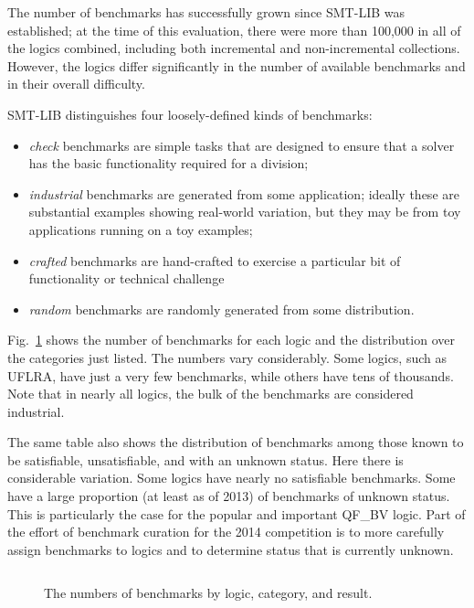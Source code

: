 \documentclass[smallcondensed]{svjour3}
\begin{document}
The number of benchmarks has successfully grown since SMT-LIB was established; at the time of this evaluation, there were more than 100,000 in all of the logics combined, including both incremental and non-incremental collections. However, the logics differ significantly in the number of available benchmarks and in their overall difficulty.

SMT-LIB distinguishes four loosely-defined kinds of benchmarks:
\begin{itemize}[noitemsep,nolistsep]
\item {\em check} benchmarks are simple tasks that are designed to ensure that a solver has the basic functionality required for a division;
\item {\em industrial} benchmarks are generated from some application; ideally these are substantial examples showing real-world variation, but they may be from toy applications running on a toy examples;
\item {\em crafted} benchmarks are hand-crafted to exercise a particular bit of functionality or technical challenge
\item {\em random} benchmarks are randomly generated from some distribution.
\end{itemize}
Fig.~\ref{Fig:category} shows the number of benchmarks for each logic and the distribution over the categories just listed. The numbers vary considerably. Some logics, such as UFLRA, have just a very few benchmarks, while others have tens of thousands. Note that in nearly all logics, the bulk of the benchmarks are 
considered industrial.

The same table also shows the distribution of benchmarks among those known to be satisfiable, unsatisfiable, and with an unknown status. Here there is 
considerable variation. Some logics have nearly no satisfiable benchmarks. Some have a large proportion (at least as of 2013) of benchmarks of unknown status.
This is particularly the case for the popular and important QF\_BV logic.
Part of the effort of benchmark curation for the 2014 competition is to more carefully assign benchmarks to logics and to determine status that is currently unknown.

\begin{figure}
\centering
\begin{tabular}{|l|r|p{.45in}p{.3in}p{.35in}p{.25in}|p{.25in}p{.25in}p{.4in}|}
\hline

\end{tabular}
\caption{The numbers of benchmarks by logic, category, and result.}
\label{Fig:category}
\end{figure}
\end{document}
